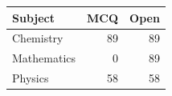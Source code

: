 \begin{tabular}{@{}lrr@{}}
\toprule
Subject & MCQ & Open \\
\midrule
Chemistry & 89 & 89 \\
Mathematics & 0 & 89 \\
Physics & 58 & 58 \\
\bottomrule
\end{tabular}
